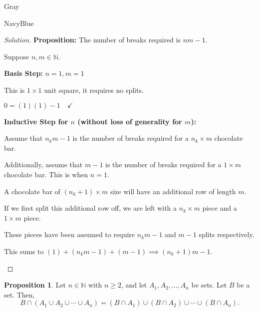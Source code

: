 \documentclass[12pt]{amsart}
\theoremstyle{named}
\newenvironment{soln}
{\begin{color}{Gray}\begin{framed}\begin{color}{NavyBlue}\begin{proof}[Solution]
\doublespacing}
{\end{proof}\end{color}\end{framed}\end{color}}
\theoremstyle{definition}
\newtheorem{proposition}{Proposition}
\newcommand{\N}{\mathbb N}
\begin{document}
\begin{soln}
	\phantom{ }

	\textbf{Proposition: } The number of breaks required is $nm - 1$. 

	Suppose $n,m \in \mathbb N$.

	\textbf{Basis Step:} $n = 1, m = 1$
	\begin{adjustwidth}{2em}{0em}
		This is $1 \times 1$ unit square, it requires no splits.

		$0 = (1)(1) - 1 \hspace{1em} \checkmark$
	\end{adjustwidth}

	\textbf{Inductive Step for $n$ (without loss of generality for $m$):}
	\begin{adjustwidth}{2em}{0em}
		Assume that $n_km - 1$ is the number of breaks required
		for a $n_k \times m$ chocolate bar. 

		Additionally, assume that $m - 1$ is the number of breaks required
		for a $1 \times m$ chocolate bar. This is when $n = 1$. 

		A chocolate bar of $(n_k + 1) \times m$ size will have an additional
		row of length $m$.

		If we first split this additional row off, we are left with a
		$n_k \times m$ piece and a $1 \times m$ piece. 

		These pieces have been assumed to require $n_km - 1$ and $m - 1$ splits
		respectively.

		This sums to $(1) + (n_km - 1) + (m - 1) \implies (n_k+1)m - 1$.
	\end{adjustwidth}
\end{soln}

\vspace*{14em}

\begin{proposition}
	Let $n\in\N$ with $n\geq 2$, and let $A_1, A_2, \ldots, A_n$ be sets.
	Let $B$ be a set.
	Then,
	$$B\cap(A_1\cup A_2\cup \cdots\cup A_n) = (B\cap A_1)\cup (B\cap A_2) \cup \cdots \cup (B\cap A_n).$$
\end{proposition}
\end{document}
